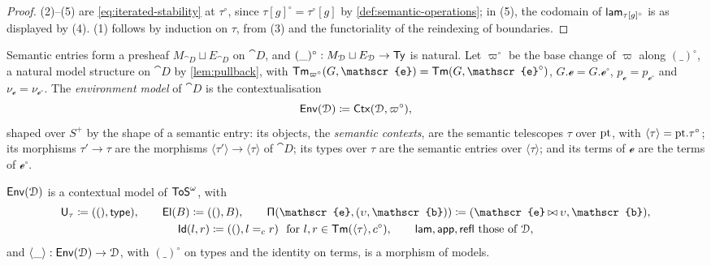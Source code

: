 \begin{proof}
    (2)--(5) are \eqref{eq:iterated-stability} at $\tau^{\circ}$, since $\tau[g]^{\circ} = \tau^{\circ}[g]$ by \cref{def:semantic-operations}; in (5), the codomain of $\mathsf{lam}_{\tau[g]^{\circ}}$ is as displayed by (4). (1) follows by induction on $\tau$, from (3) and the functoriality of the reindexing of boundaries.
\end{proof}

\begin{definition}\label{def:environment-model}
    Semantic entries form a presheaf $M_{\cat{D}} \sqcup E_{\cat{D}}$ on $\cat{D}$, and $(\_)^{\circ} : M_{\mathcal{D}} \sqcup E_{\mathcal{D}} \to \mathsf{Ty}$ is natural. Let $\varpi^{\circ}$ be the base change of $\varpi$ along $(\_)^{\circ}$, a natural model structure on $\cat{D}$ by \cref{lem:pullback}, with $\Tm_{\varpi^{\circ}}(G, \mathscr{e}) = \Tm(G, \mathscr{e}^{\circ})$, $G.\mathscr{e} = G.\mathscr{e}^{\circ}$, $p_{\mathscr{e}} = p_{\mathscr{e}^{\circ}}$ and $\nu_{\mathscr{e}} = \nu_{\mathscr{e}^{\circ}}$. The \emph{environment model} of $\cat{D}$ is the contextualisation
    \[
        \mathsf{Env}(\mathcal{D}) \coloneqq \mathsf{Ctx}(\mathcal{D}, \varpi^{\circ}),
    \]
    shaped over $S^+$ by the shape of a semantic entry: its objects, the \emph{semantic contexts}, are the semantic telescopes $\tau$ over $\mathrm{pt}$, with $\langle \tau \rangle = \mathrm{pt}.\tau^{\circ}$; its morphisms $\tau' \to \tau$ are the morphisms $\langle \tau' \rangle \to \langle \tau \rangle$ of $\cat{D}$; its types over $\tau$ are the semantic entries over $\langle \tau \rangle$; and its terms of $\mathscr{e}$ are the terms of $\mathscr{e}^{\circ}$.
\end{definition}

\begin{lemma}\label{lem:environment-model}
    $\mathsf{Env}(\mathcal{D})$ is a contextual model of $\mathsf{ToS}^\omega$, with
    \begin{gather*}
        \Univ_\tau \coloneqq ((), \mathsf{type}), \qquad \El(B) \coloneqq ((), B), \qquad \PiT(\mathscr{e}, (\upsilon, \mathscr{b})) \coloneqq (\mathscr{e} \concat \upsilon, \mathscr{b}),\\
        \Id(l, r) \coloneqq ((), l =_{c} r) \ \text{ for } l, r \in \Tm(\langle \tau \rangle, c^{\circ}), \qquad \lam, \app, \refl \text{ those of } \cat{D},
    \end{gather*}
    and $\langle \_ \rangle : \mathsf{Env}(\mathcal{D}) \to \mathcal{D}$, with $(\_)^{\circ}$ on types and the identity on terms, is a morphism of models.
\end{lemma}

